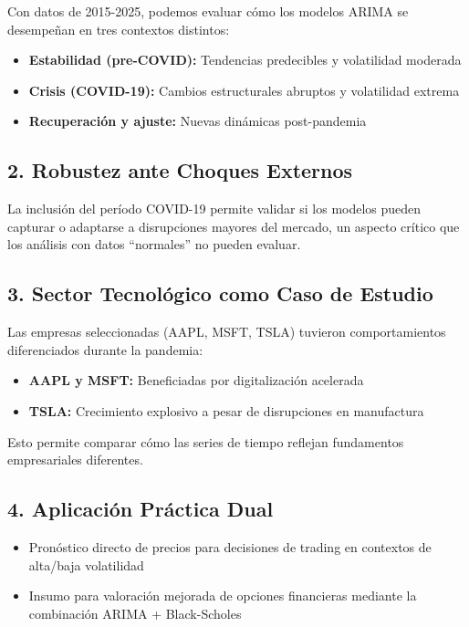 \documentclass[
]{book}
\providecommand{\tightlist}{%
  \setlength{\itemsep}{0pt}\setlength{\parskip}{0pt}}
\begin{document}
Con datos de 2015-2025, podemos evaluar cómo los modelos ARIMA se desempeñan en tres contextos distintos:

\begin{itemize}
\tightlist
\item
  \textbf{Estabilidad (pre-COVID):} Tendencias predecibles y volatilidad moderada
\item
  \textbf{Crisis (COVID-19):} Cambios estructurales abruptos y volatilidad extrema
\item
  \textbf{Recuperación y ajuste:} Nuevas dinámicas post-pandemia
\end{itemize}

\subsection{2. Robustez ante Choques Externos}\label{robustez-ante-choques-externos}

La inclusión del período COVID-19 permite validar si los modelos pueden capturar o adaptarse a disrupciones mayores del mercado, un aspecto crítico que los análisis con datos ``normales'' no pueden evaluar.

\subsection{3. Sector Tecnológico como Caso de Estudio}\label{sector-tecnoluxf3gico-como-caso-de-estudio}

Las empresas seleccionadas (AAPL, MSFT, TSLA) tuvieron comportamientos diferenciados durante la pandemia:

\begin{itemize}
\tightlist
\item
  \textbf{AAPL y MSFT:} Beneficiadas por digitalización acelerada
\item
  \textbf{TSLA:} Crecimiento explosivo a pesar de disrupciones en manufactura
\end{itemize}

Esto permite comparar cómo las series de tiempo reflejan fundamentos empresariales diferentes.

\subsection{4. Aplicación Práctica Dual}\label{aplicaciuxf3n-pruxe1ctica-dual}

\begin{itemize}
\tightlist
\item
  Pronóstico directo de precios para decisiones de trading en contextos de alta/baja volatilidad
\item
  Insumo para valoración mejorada de opciones financieras mediante la combinación ARIMA + Black-Scholes
\end{itemize}
\end{document}
